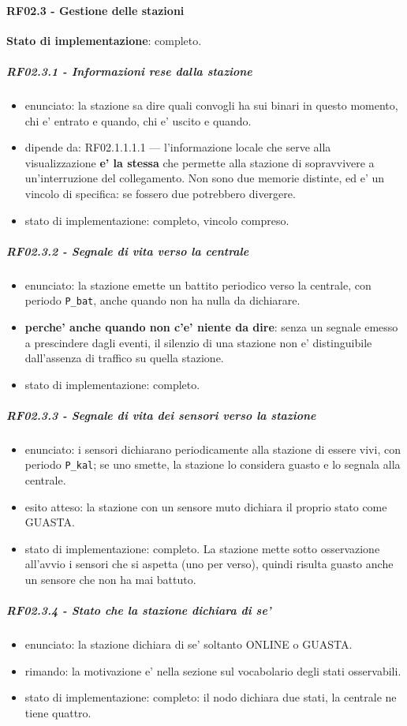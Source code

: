 \documentclass[11pt]{article}
\begin{document}
\paragraph{RF02.3 - Gestione delle stazioni}
\label{sec:org910afe9}

\textbf{Stato di implementazione}: completo.
\subparagraph{RF02.3.1 - Informazioni rese dalla stazione}
\label{sec:org0195bf9}
\begin{itemize}
\item enunciato: la stazione sa dire quali convogli ha sui binari in questo momento, chi e' entrato e
quando, chi e' uscito e quando.
\item dipende da: RF02.1.1.1.1 — l'informazione locale che serve alla visualizzazione \textbf{e' la stessa} che
permette alla stazione di sopravvivere a un'interruzione del collegamento. Non sono due memorie
distinte, ed e' un vincolo di specifica: se fossero due potrebbero divergere.
\item stato di implementazione: completo, vincolo compreso.
\end{itemize}
\subparagraph{RF02.3.2 - Segnale di vita verso la centrale}
\label{sec:orgc6e2ff8}
\begin{itemize}
\item enunciato: la stazione emette un battito periodico verso la centrale, con periodo \texttt{P\_bat}, anche
quando non ha nulla da dichiarare.
\item \textbf{perche' anche quando non c'e' niente da dire}: senza un segnale emesso a prescindere dagli eventi,
il silenzio di una stazione non e' distinguibile dall'assenza di traffico su quella stazione.
\item stato di implementazione: completo.
\end{itemize}
\subparagraph{RF02.3.3 - Segnale di vita dei sensori verso la stazione}
\label{sec:orgf1a5834}
\begin{itemize}
\item enunciato: i sensori dichiarano periodicamente alla stazione di essere vivi, con periodo \texttt{P\_kal};
se uno smette, la stazione lo considera guasto e lo segnala alla centrale.
\item esito atteso: la stazione con un sensore muto dichiara il proprio stato come GUASTA.
\item stato di implementazione: completo. La stazione mette sotto osservazione all'avvio i sensori che
si aspetta (uno per verso), quindi risulta guasto anche un sensore che non ha mai battuto.
\end{itemize}
\subparagraph{RF02.3.4 - Stato che la stazione dichiara di se'}
\label{sec:org71a2947}
\begin{itemize}
\item enunciato: la stazione dichiara di se' soltanto ONLINE o GUASTA.
\item rimando: la motivazione e' nella sezione sul vocabolario degli stati osservabili.
\item stato di implementazione: completo: il nodo dichiara due stati, la centrale ne tiene quattro.
\end{itemize}
\end{document}
